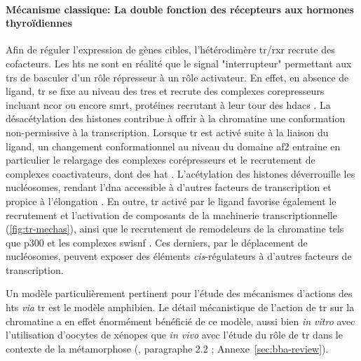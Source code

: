 \documentclass[../main.tex]{subfiles}
\begin{document}
\paragraph{Mécanisme classique: La double fonction des récepteurs aux hormones thyroïdiennes}
Afin de réguler l'expression de gènes cibles, l'hétérodimère \gls{tr}/\gls{rxr} recrute des cofacteurs.
Les \glspl{ht} ne sont en réalité que le signal "interrupteur" permettant aux \glspl{tr} de basculer d'un rôle répresseur à un rôle activateur.
En effet, en absence de ligand, \gls{tr} se fixe au niveau des \glspl{tre} et recrute des complexes corepresseurs incluant \gls{ncor} ou encore \gls{smrt}, protéines recrutant à leur tour des \glspl{hdac} \citep{Wong1998}.
La désacétylation des histones contribue à offrir à la chromatine une conformation non-permissive à la transcription.
Lorsque \gls{tr} est activé suite à la liaison du ligand, un changement conformationnel au niveau du domaine \gls{af2} entraine en particulier le relargage des complexes corépresseurs et le recrutement de complexes coactivateurs, dont des \gls{hat} \citep{Wolffe1997}.
L'acétylation des histones déverrouille les nucléosomes, rendant l'\gls{dna} accessible à d'autres facteurs de transcription et propice à l'élongation \citep{Wong1997}.
En outre, \gls{tr} activé par le ligand favorise également le recrutement et l'activation de composants de la machinerie transcriptionnelle (\autoref{fig:tr-mechas}), ainsi que le recrutement de remodeleurs de la chromatine tels que p300 et les complexes \gls{swisnf} \citep{Huang2003,Heimeier2008}.
Ces derniers, par le déplacement de nucléosomes, peuvent exposer des éléments \textit{cis}-régulateurs à d'autres facteurs de transcription.
\par
Un modèle particulièrement pertinent pour l'étude des mécanismes d'actions des \glspl{ht} \textit{via} \gls{tr} est le modèle amphibien.
Le détail mécanistique de l'action de \gls{tr} sur la chromatine a en effet énormément bénéficié de ce modèle, aussi bien \textit{in vitro} avec l'utilisation d'oocytes de xénopes que \textit{in vivo} avec l'étude du rôle de \gls{tr} dans le contexte de la métamorphose (\citealp{Grimaldi2012}, paragraphe 2.2 ; Annexe~\ref{sec:bba-review}).
\end{document}
